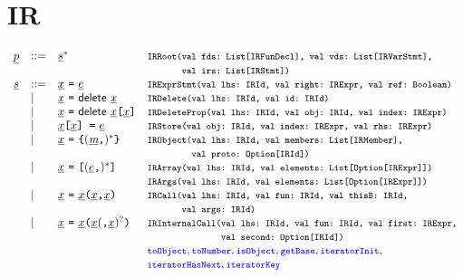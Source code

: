 \chapter{IR}
\small
\[
\begin{array}{llll}
\ir\pgm & ::= & \ir\stmt^* & \mtt{IRRoot(val fds:~List[IRFunDecl], val vds:~List[IRVarStmt],}\\
&&&\mtt{\phantom{IRRoot(}val irs:~List[IRStmt])}\\

\ir\stmt & ::= & \irid \ \verb+=+ \ \ir\expr &
 \mtt{IRExprStmt(val lhs:~IRId, val right:~IRExpr, val ref:~Boolean)}\\

&\mid& \irid \ \verb+=+ \ {\sf delete}\ \irid
& \mtt{IRDelete(val lhs:~IRId, val id:~IRId)}\\

 &\mid& \irid \ \verb+=+ \ {\sf delete}\ \irid\verb+[+\irid\verb+]+
 & \mtt{IRDeleteProp(val lhs:~IRId, val obj:~IRId, val index:~IRExpr)}\\

 &\mid& \irid\verb+[+\irid\verb+] =+ \ \irexpr & \mtt{IRStore(val obj:~IRId, val index:~IRExpr, val rhs:~IRExpr)}\\
 &\mid& \irid \ \verb+=+ \ \verb+{+ (\ir\member\verb+,+)^* \verb+}+
 & \mtt{IRObject(val lhs:~IRId, val members:~List[IRMember],}\\
&&&\mtt{\phantom{IRObject(}val proto:~Option[IRId])}\\
 &\mid& \irid \ \verb+=+ \ \verb+[+ (\irexpr\verb+,+)^* \verb+]+ & \mtt{IRArray(val lhs:~IRId, val elements:~List[Option[IRExpr]])}\\
&&&\mtt{IRArgs(val lhs:~IRId, val elements:~List[Option[IRExpr]])}\\

 &\mid& \irid \ \verb+=+ \ \irid\verb+(+\irid\verb+,+\irid\verb+)+
& \mtt{IRCall(val lhs:~IRId, val fun:~IRId, val thisB:~IRId,}\\
&&&\mtt{\phantom{IRCall(}val args:~IRId)}\\
 &\mid& \irid \ \verb+=+ \ \irid\verb+(+\irid(\verb+,+\irid)^?\verb+)+
& \mtt{IRInternalCall(val lhs:~IRId, val fun:~IRId, val first:~IRExpr,}\\
&&&\mtt{\phantom{IRInternalCall(}val second:~Option[IRId])}\\
&&&{\inblue \mtt{toObject}, \mtt{toNumber}, \mtt{isObject},
\mtt{getBase}, \mtt{iteratorInit},}\\
&&&{\inblue \mtt{iteratorHasNext}, \mtt{iteratorKey}}\\


\end{array}\]
